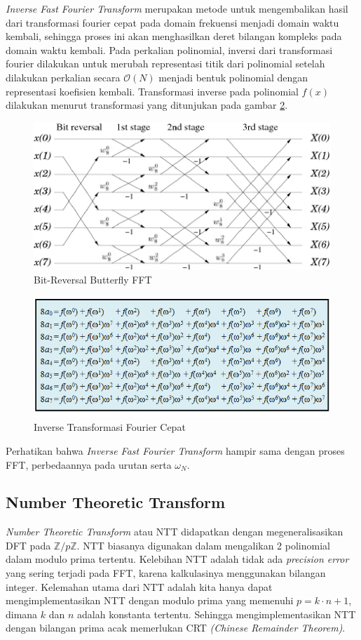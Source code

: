 \textit{Inverse Fast Fourier Transform} merupakan metode untuk mengembalikan hasil dari transformasi fourier cepat pada domain frekuensi menjadi domain waktu kembali, sehingga proses ini akan menghasilkan deret bilangan kompleks pada domain waktu kembali. Pada perkalian polinomial, inversi dari transformasi fourier dilakukan untuk merubah representasi titik dari polinomial setelah dilakukan perkalian secara $ \mathcal{O}{(N)} $ menjadi bentuk polinomial dengan representasi koefisien kembali. Transformasi inverse pada polinomial $ f(x) $ dilakukan menurut transformasi yang ditunjukan pada gambar \ref{fig:inverse-fft}.
\begin{figure}
	\Centering
	\includegraphics [scale=0.7]{bab2/img/bit-reverse-fft-butterfly}
	\caption {Bit-Reversal Butterfly FFT}
	\label {fig:bit-reverse-fft-butterfly}
\end{figure}

\begin{figure}
	\Centering
	\includegraphics [scale=0.6]{bab2/img/inverse-fft}
	\caption {Inverse Transformasi Fourier Cepat}
	\label {fig:inverse-fft}
\end{figure}
Perhatikan bahwa \textit{Inverse Fast Fourier Transform} hampir sama dengan proses FFT, perbedaannya pada urutan serta $ \omega_N $.

\subsection{ Number Theoretic Transform} \label{ssec:ntt}
\textit{Number Theoretic Transform} atau NTT didapatkan dengan megeneralisasikan DFT pada $ \mathbb{Z}/p\mathbb{Z} $. NTT biasanya digunakan dalam mengalikan 2 polinomial dalam modulo prima tertentu. Kelebihan NTT adalah tidak ada \textit{precision error} yang sering terjadi pada FFT, karena kalkulasinya menggunakan bilangan integer. Kelemahan utama dari NTT adalah kita hanya dapat mengimplementasikan NTT dengan modulo prima yang memenuhi $ p = k \cdot n + 1 $, dimana $ k $ dan $ n $ adalah konstanta tertentu. Sehingga mengimplementasikan NTT dengan bilangan prima acak memerlukan CRT \textit{(Chinese Remainder Theorem)}.


